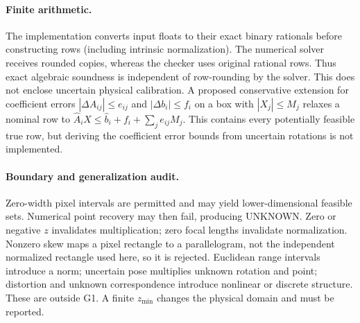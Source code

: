 \documentclass[11pt]{article}
\begin{document}
\paragraph{Finite arithmetic.}
The implementation converts input floats to their exact binary rationals before constructing rows (including intrinsic normalization). The numerical solver receives rounded copies, whereas the checker uses original rational rows. Thus exact algebraic soundness is independent of row-rounding by the solver. This does not enclose uncertain physical calibration. A proposed conservative extension for coefficient errors $|\Delta A_{ij}|\le e_{ij}$ and $|\Delta b_i|\le f_i$ on a box with $|X_j|\le M_j$ relaxes a nominal row to $\hat A_iX\le\hat b_i+f_i+\sum_j e_{ij}M_j$. This contains every potentially feasible true row, but deriving the coefficient error bounds from uncertain rotations is not implemented.

\paragraph{Boundary and generalization audit.}
Zero-width pixel intervals are permitted and may yield lower-dimensional feasible sets. Numerical point recovery may then fail, producing UNKNOWN. Zero or negative $z$ invalidates multiplication; zero focal lengths invalidate normalization. Nonzero skew maps a pixel rectangle to a parallelogram, not the independent normalized rectangle used here, so it is rejected. Euclidean range intervals introduce a norm; uncertain pose multiplies unknown rotation and point; distortion and unknown correspondence introduce nonlinear or discrete structure. These are outside G1. A finite $z_{\min}$ changes the physical domain and must be reported.
\end{document}
